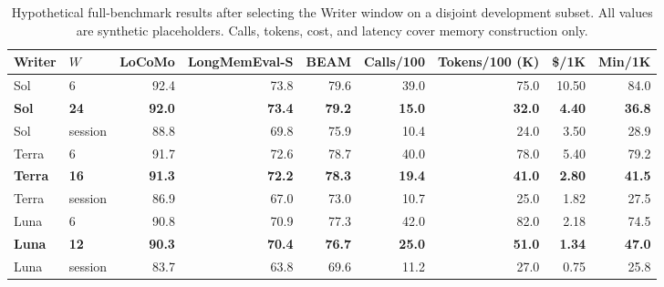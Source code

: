 \begin{table}[t]
\centering
\caption{Hypothetical full-benchmark results after selecting the Writer window on a disjoint development subset. All values are synthetic placeholders. Calls, tokens, cost, and latency cover memory construction only.}
\label{tab:mock_chunk_main}
\small
\begin{tabular}{llrrrrrrr}
\toprule
Writer & $W$ & LoCoMo & LongMemEval-S & BEAM & Calls/100 & Tokens/100 (K) & \$/1K & Min/1K \\
\midrule
Sol & 6 & 92.4 & 73.8 & 79.6 & 39.0 & 75.0 & 10.50 & 84.0 \\
\textbf{Sol} & \textbf{24} & \textbf{92.0} & \textbf{73.4} & \textbf{79.2} & \textbf{15.0} & \textbf{32.0} & \textbf{4.40} & \textbf{36.8} \\
Sol & session & 88.8 & 69.8 & 75.9 & 10.4 & 24.0 & 3.50 & 28.9 \\
\midrule
Terra & 6 & 91.7 & 72.6 & 78.7 & 40.0 & 78.0 & 5.40 & 79.2 \\
\textbf{Terra} & \textbf{16} & \textbf{91.3} & \textbf{72.2} & \textbf{78.3} & \textbf{19.4} & \textbf{41.0} & \textbf{2.80} & \textbf{41.5} \\
Terra & session & 86.9 & 67.0 & 73.0 & 10.7 & 25.0 & 1.82 & 27.5 \\
\midrule
Luna & 6 & 90.8 & 70.9 & 77.3 & 42.0 & 82.0 & 2.18 & 74.5 \\
\textbf{Luna} & \textbf{12} & \textbf{90.3} & \textbf{70.4} & \textbf{76.7} & \textbf{25.0} & \textbf{51.0} & \textbf{1.34} & \textbf{47.0} \\
Luna & session & 83.7 & 63.8 & 69.6 & 11.2 & 27.0 & 0.75 & 25.8 \\
\bottomrule
\end{tabular}
\end{table}

